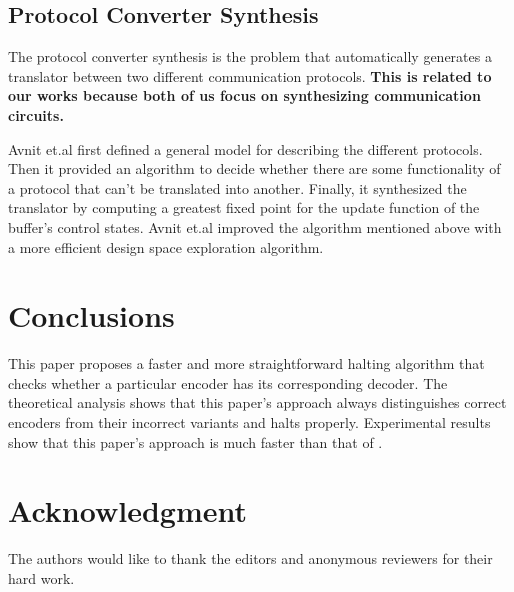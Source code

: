 \documentclass[journal]{IEEEtran}
\begin{document}
\subsection{Protocol Converter Synthesis}
The protocol converter synthesis is the problem that automatically generates a translator between two different communication protocols.
\textbf{This is related to our works because both of us focus on synthesizing communication circuits.}

Avnit et.al \cite{converter_date08,converter_todeas09} first defined a general model for describing the different protocols.
Then it provided an algorithm to decide
whether there are some functionality of a protocol that can't be translated into another.
Finally,
it synthesized the translator by computing a greatest fixed point for the update function of the buffer's control states.
Avnit et.al\cite{converter_date09} improved the algorithm mentioned above with a more efficient design space exploration algorithm.


\section{Conclusions}\label{sec_conclude}

This paper proposes a faster and more straightforward halting algorithm that checks whether a particular encoder has its corresponding decoder.
The theoretical analysis shows that this paper's approach always distinguishes correct encoders from their incorrect variants and halts properly.
Experimental results show that this paper's approach is much faster than that of \cite{ShengYuShen:fmcad10}.


%

\section*{Acknowledgment}
The authors would like to thank the editors and anonymous reviewers for their hard work.
\end{document}
